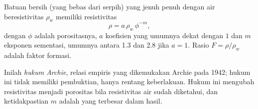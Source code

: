 \begin{proposition}\label{prop:b3:field-lab-methods-3:archie}
Batuan bersih (yang bebas dari serpih) yang jenuh penuh dengan air
beresistivitas $\rho_w$ memiliki resistivitas
\[
\rho = a\,\rho_w\,\phi^{-m} ,
\]
dengan $\phi$ adalah porositasnya, $a$ koefisien yang umumnya dekat dengan $1$
dan $m$ eksponen sementasi, umumnya antara \num{1.3} dan
\num{2.8} jika $a = 1$. Rasio $F = \rho/\rho_w$ adalah
faktor formasi.
\end{proposition}
Inilah \emph{hukum Archie}, relasi empiris
yang dikemukakan Archie pada 1942; hukum ini tidak memiliki pembuktian, hanya rentang keberlakuan. Hukum ini mengubah resistivitas menjadi porositas bila
resistivitas air sudah diketahui, dan ketidakpastian $m$ adalah yang terbesar dalam hasil.

